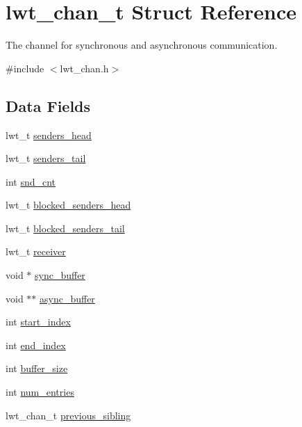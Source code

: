 \hypertarget{structlwt__channel}{\section{lwt\+\_\+chan\+\_\+t Struct Reference}
\label{structlwt__channel}
}


The channel for synchronous and asynchronous communication.  




{\ttfamily \#include $<$lwt\+\_\+chan.\+h$>$}

\subsection*{Data Fields}
\begin{DoxyCompactItemize}
\item 
lwt\+\_\+t \hyperlink{structlwt__channel_ad839ac9ea47e3a6ee79dc14d2773d3a3}{senders\+\_\+head}
\item 
lwt\+\_\+t \hyperlink{structlwt__channel_a24de7786f0a6b38d6c3fe6bc18947f2e}{senders\+\_\+tail}
\item 
int \hyperlink{structlwt__channel_ab7687f6e58c0d4cb4c2de7db501fb046}{snd\+\_\+cnt}
\item 
lwt\+\_\+t \hyperlink{structlwt__channel_a34b43c8980f830472deb0cc60a632257}{blocked\+\_\+senders\+\_\+head}
\item 
lwt\+\_\+t \hyperlink{structlwt__channel_ad2912304612b27ba7a7b5dd2ec3e2415}{blocked\+\_\+senders\+\_\+tail}
\item 
lwt\+\_\+t \hyperlink{structlwt__channel_a740680d836200bfc87150333e4d62785}{receiver}
\item 
void $\ast$ \hyperlink{structlwt__channel_a19260280268d501a8e6d341c21eba961}{sync\+\_\+buffer}
\item 
void $\ast$$\ast$ \hyperlink{structlwt__channel_a52a4a997c097ddda52e23b0bf61216e2}{async\+\_\+buffer}
\item 
int \hyperlink{structlwt__channel_a722d06e3fd594282b001e14d61ba4d33}{start\+\_\+index}
\item 
int \hyperlink{structlwt__channel_abb64ed65a8a46420c6dddf1758de401e}{end\+\_\+index}
\item 
int \hyperlink{structlwt__channel_a756f9eb27e6321fa7fa5611c2c6bb9eb}{buffer\+\_\+size}
\item 
int \hyperlink{structlwt__channel_a6d697010ea3cb8783ca62b526a9db6d1}{num\+\_\+entries}
\item 
lwt\+\_\+chan\+\_\+t \hyperlink{structlwt__channel_a62840bc52e01e67e063776f8205dd43e}{previous\+\_\+sibling}
$$
\end{DoxyCompactItemize}
